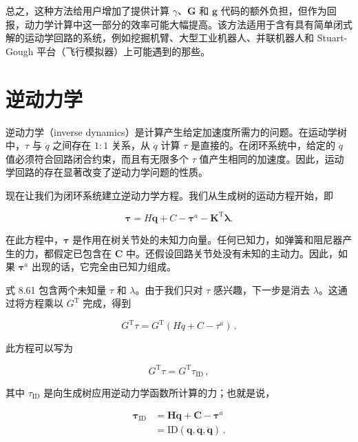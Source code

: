 \documentclass[10pt,a4paper]{book}
\theoremstyle{thmstyle} %
\theoremstyle{defstyle} %
\theoremstyle{prostyle} %
\begin{document}
总之，这种方法给用户增加了提供计算 $\gamma$、$\boldsymbol{G}$ 和 $\boldsymbol{g}$ 代码的额外负担，但作为回报，动力学计算中这一部分的效率可能大幅提高。该方法适用于含有具有简单闭式解的运动学回路的系统，例如挖掘机臂、大型工业机器人、并联机器人和 Stuart-Gough 平台（飞行模拟器）上可能遇到的那些。



\section{逆动力学}





逆动力学（inverse dynamics）是计算产生给定加速度所需力的问题。在运动学树中，$\tau$ 与 $\ddot{q}$ 之间存在 $1:1$ 关系，从 $\ddot{q}$ 计算 $\tau$ 是直接的。在闭环系统中，给定的 $\ddot{q}$ 值必须符合回路闭合约束，而且有无限多个 $\tau$ 值产生相同的加速度。因此，运动学回路的存在显著改变了逆动力学问题的性质。



现在让我们为闭环系统建立逆动力学方程。我们从生成树的运动方程开始，即



$$
\boldsymbol { \tau } = H \ddot { \boldsymbol { q } } + C - \boldsymbol { \tau } ^{a} - \boldsymbol { K } ^{\mathrm { T} } \boldsymbol { \lambda } .
$$



在此方程中，$\boldsymbol{\tau}$ 是作用在树关节处的未知力向量。任何已知力，如弹簧和阻尼器产生的力，都假定已包含在 $\boldsymbol{C}$ 中。还假设回路关节处没有未知的主动力。因此，如果 $\boldsymbol{\tau}^{a}$ 出现的话，它完全由已知力组成。



式 8.61 包含两个未知量 $\tau$ 和 $\lambda$。由于我们只对 $\tau$ 感兴趣，下一步是消去 $\lambda$。这通过将方程乘以 $G^{\mathrm{T}}$ 完成，得到



$$
G ^{\mathrm { T} } \tau = G ^{\mathrm { T} } ( H \ddot { q } + C - \tau ^{a} ) \, .
$$



此方程可以写为



$$
G ^{\mathrm { T} } \tau = G ^{\mathrm { T} } \tau _ { \mathrm { I D } } \, ,
$$



其中 $\tau_{\mathrm{ID}}$ 是向生成树应用逆动力学函数所计算的力；也就是说，



$$
\begin{array}{rl} { \boldsymbol{ \tau } _ { \mathrm { I D } } } & { = \boldsymbol{ H } \ddot { \boldsymbol{ q } } + \boldsymbol{ C } - \boldsymbol{ \tau } ^{a} } \\& { = \mathrm { I D } ( \boldsymbol{ q } , \dot { \boldsymbol{ q } } , \ddot { \boldsymbol{ q } } ) \, . } \end{array}
$$
\end{document}
